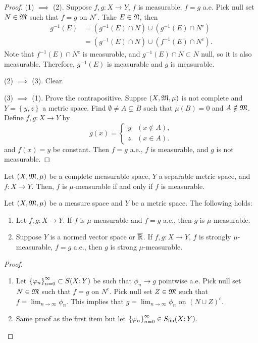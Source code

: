 \documentclass[a4paper]{article}
\begin{document}
\begin{proof}
  
(1) $\implies$ (2). Suppose $f, g: X \to Y$, $f$ is measurable, 
$f = g$ a.e. Pick null set $N \in \mathfrak{M}$ such that 
$f = g$ on $N^c$. Take $E \in \mathfrak{N}$, then 
\[
\begin{aligned}
  g^{-1}(E) 
  &= (g^{-1}(E) \cap N) \cup (g^{-1} (E) \cap N^c) \\
  &= (g^{-1}(E) \cap N) \cup (f^{-1} (E) \cap N^c).
\end{aligned}
\]
Note that $f^{-1}(E) \cap N^c$ is measurable, 
and $g^{-1}(E) \cap N \subset N$ null, so it is also measurable.
Therefore, $g^{-1}(E)$ is measurable and $g$ is measurable.

(2) $\implies$ (3). Clear. 

(3) $\implies$ (1). Prove the contrapositive. 
Suppse $(X, \mathfrak{M}, \mu)$ is not complete and 
$Y = \left\{ y, z \right\}$ a metric space. 
Find $\emptyset \neq A \subsetneq B$ such that 
$\mu(B) = 0$ and $A \notin \mathfrak{M}$. Define $f, g : 
X \to Y$ by 
\[
g(x) = \begin{cases}
  y & (x \notin A), \\
  z & (x \in A).
\end{cases}
\]
and $f(x) = y$ be constant. Then $f = g$ a.e., 
$f$ is measurable, and $g$ is not measurable. 
\end{proof}

\begin{cor}
  Let $(X, \mathfrak{M}, \mu)$ be a complete measurable space,
  $Y$ a separable metric space, and $f: X \to Y$. 
  Then, $f$ is $\mu$-measurable if and only if 
  $f$ is measurable.
\end{cor}

\begin{prop}
  Let $(X, \mathfrak{M}, \mu)$ be a measure space and $Y$ be a metric 
  space. The following holds: 
  \begin{enumerate}
    \item Let $f, g: X \to Y$. If $f$ is $\mu$-measurable
    and $f = g$ a.e., then $g$ is $\mu$-measurable.

    \item Suppose $Y$ is a normed vector space or 
    $\overline{\mathbb{R}}$. If $f, g: X \to Y$, $f$ is strongly 
    $\mu$-measurable, $f = g$ a.e., then 
    $g$ is strong $\mu$-measurable.
  \end{enumerate}
\end{prop}

\begin{proof}
  \begin{enumerate}
    \item Let $\left\{ \varphi_n \right\}_{n=0}^\infty \subset S(X; Y)$ be such that 
    $\phi_n \to g$ pointwise a.e. Pick null set 
    $N \in \mathfrak{M}$ such that $f = g$ on $N^c$. Pick 
    null set $Z \in \mathfrak{M}$ such that $f = \lim_{n \to \infty}
    \phi_n$. This implies that 
    $g = \lim_{n \to \infty} \phi_n$ on $(N \cup Z)^c$. 

    \item Same proof as the first item but let 
    $\left\{ \varphi_n \right\}_{n=0}^\infty \in S_{\text{fin}}(X; Y)$.
  \end{enumerate}
\end{proof}
\end{document}

